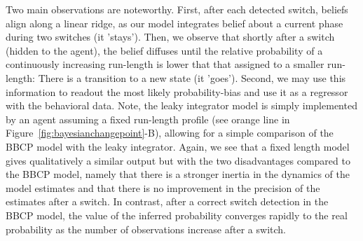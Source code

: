 \documentclass[12pt,english]{article}%
\newcommand{\seeFig}[1]{Figure~\ref{fig:#1}}
\begin{document}
Two main observations are noteworthy. First, after each detected switch, beliefs align along a linear ridge,
as our model integrates belief about a current phase during two switches (it 'stays').
Then, we observe that shortly after a switch (hidden to the agent),
the belief diffuses until the relative probability of a continuously increasing run-length
is lower that that assigned to a smaller run-length:
There is a transition to a new state (it 'goes').
Second, we may use this information to readout the most likely probability-bias and 
use it as a regressor with the behavioral data.
Note, the leaky integrator model is simply implemented
by an agent assuming a fixed run-length profile (see orange line in \seeFig{bayesianchangepoint}-B),
allowing for a simple comparison of the BBCP model with the leaky integrator.
Again, we see that a fixed length model gives qualitatively a similar output
but with the two disadvantages compared to the BBCP model, namely that 
there is a stronger inertia in the dynamics of the model estimates and 
that there is no improvement in the precision of the estimates after a switch.
In contrast, after a correct switch detection in the BBCP model, 
the value of the inferred probability converges rapidly to the real probability
as the number of observations increase after a switch.
\end{document}
